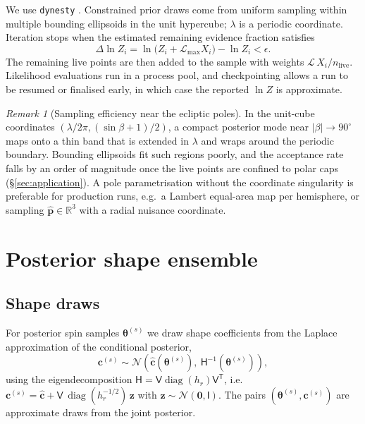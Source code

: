 \documentclass[11pt,a4paper]{article}
\theoremstyle{remark}
\newtheorem{remark}{Remark}
\newcommand{\vect}[1]{\bm{#1}}
\newcommand{\uv}[1]{\hat{\bm{#1}}}
\newcommand{\R}{\mathbb{R}}
\newcommand{\T}{^{\mathsf T}}
\DeclareMathOperator{\diag}{diag}
\begin{document}
We use \texttt{dynesty} \citep{speagle2020}. Constrained prior draws come from uniform sampling within
multiple bounding ellipsoids \citep{mukherjee2006,feroz2009} in the unit hypercube; $\lambda$ is a
periodic coordinate. Iteration stops when the estimated remaining evidence fraction satisfies
\begin{equation}
  \Delta\ln Z_i=\ln\bigl(Z_i+\mathcal L_{\max}X_i\bigr)-\ln Z_i<\epsilon .
\end{equation}
The remaining live points are then added to the sample with weights $\mathcal L\,X_i/n_{\mathrm{live}}$.
Likelihood evaluations run in a process pool, and checkpointing allows a run to be resumed or
finalised early, in which case the reported $\ln Z$ is approximate.

\begin{remark}[Sampling efficiency near the ecliptic poles]
In the unit-cube coordinates $(\lambda/2\pi,(\sin\beta+1)/2)$, a compact posterior mode near
$|\beta|\to90^\circ$ maps onto a thin band that is extended in $\lambda$ and wraps around the periodic
boundary. Bounding ellipsoids fit such regions poorly, and the acceptance rate falls by an order of
magnitude once the live points are confined to polar caps (\S\ref{sec:application}). A pole
parametrisation without the coordinate singularity is preferable for production runs, e.g.\ a Lambert
equal-area map per hemisphere, or sampling $\uv p\in\R^3$ with a radial nuisance coordinate.
\end{remark}

\section{Posterior shape ensemble}
\label{sec:ensemble}

\subsection{Shape draws}
For posterior spin samples $\vect\theta^{(s)}$ we draw shape coefficients from the Laplace
approximation of the conditional posterior,
\begin{equation}
  \vect c^{(s)}\sim\mathcal N\!\left(\hat{\vect c}(\vect\theta^{(s)}),\ \mathsf H^{-1}(\vect\theta^{(s)})\right),
\end{equation}
using the eigendecomposition $\mathsf H=\mathsf V\diag(h_r)\mathsf V\T$, i.e.\
$\vect c^{(s)}=\hat{\vect c}+\mathsf V\,\diag(h_r^{-1/2})\,\vect z$ with $\vect z\sim\mathcal N(\vect 0,\mathsf I)$.
The pairs $(\vect\theta^{(s)},\vect c^{(s)})$ are approximate draws from the joint posterior.
\end{document}
